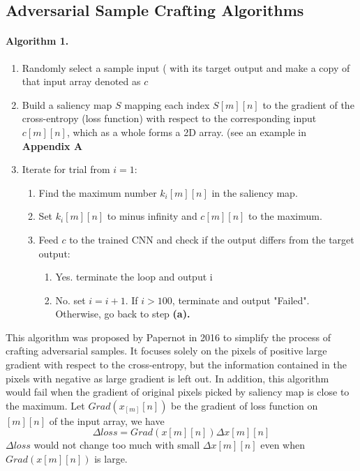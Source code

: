 \documentclass{article}
\begin{document}
\subsection{Adversarial Sample Crafting Algorithms}
\paragraph{Algorithm 1.}
\begin{enumerate}

\item Randomly select a sample input ( with its target output and make a copy of that input array denoted as $c$

\item Build a saliency map $S$ mapping each index $S[m][n]$ to the gradient of the cross-entropy (loss function) with respect to the corresponding input$c[m][n]$, which as a whole forms a 2D array. (see an example in \textbf{Appendix A}

\item Iterate for trial from $i=1$:

\begin{enumerate}
	\item Find the maximum number $k_i[m][n]$ in the saliency map.

	\item Set $k_i[m][n]$ to minus infinity  and $c[m][n]$ to the maximum.

	\item Feed $c$ to the trained CNN and check if the output differs from the target output:
		\begin{enumerate}
			\item Yes. terminate the loop and output i
			\item No. set $i=i+1$. If $i > 100$, terminate and output "Failed". Otherwise, go back to step \textbf{(a).}
		\end{enumerate}
\end{enumerate}
\end{enumerate}
This algorithm was proposed by Papernot\cite{Papernot} in 2016 to simplify the process of crafting adversarial samples. It focuses solely on the pixels of positive large gradient with respect to the cross-entropy, but the information contained in the pixels with negative as large gradient is left out.
In addition, this algorithm would fail when the gradient of original pixels picked by saliency map is close to the maximum.\cite{Papernot2}
Let $Grad(x_[m][n])$ be the gradient of loss function on $[m][n]$ of the input array, we have 
\begin{equation}
	\Delta loss = Grad(x[m][n])\Delta x[m][n]
\end{equation}
$\Delta loss$ would not change too much with small $\Delta x[m][n]$ even when $Grad(x[m][n])$ is large.
\end{document}
